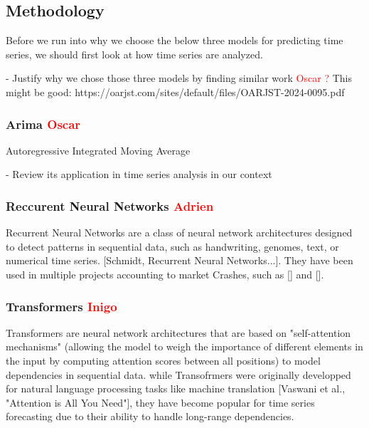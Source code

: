 \documentclass[12pt, letterpaper]{article}
\begin{document}





\subsection*{Methodology}
Before we run into why we choose the below three models for predicting time series, we should first look at how time series are analyzed. 

- Justify why we chose those three models by finding similar work \textcolor{red}{Oscar ?} This might be good: https://oarjst.com/sites/default/files/OARJST-2024-0095.pdf
    \subsubsection*{Arima \textcolor{red}{Oscar}}
    Autoregressive Integrated Moving Average 

    - Review its application in time series analysis in our context
    \subsubsection*{Reccurent Neural Networks \textcolor{red}{Adrien}}
    Recurrent Neural Networks are a class of neural network architectures designed to detect patterns in sequential data, such as handwriting, genomes, text, or numerical time series. [Schmidt, Recurrent Neural Networks...]. They have been used in multiple projects accounting to market Crashes, such as [] and [].

    \subsubsection*{Transformers \textcolor{red}{Inigo}}
Transformers are neural network architectures that are based on "self-attention mechanisms" (allowing the model to weigh the importance of different elements in the input by computing attention scores between all positions) to model dependencies in sequential data. while Transofrmers were originally developped for natural language processing tasks like machine translation [Vaswani et al., "Attention is All You Need"], they have become popular for time series forecasting due to their ability to handle long-range dependencies.
\end{document}
